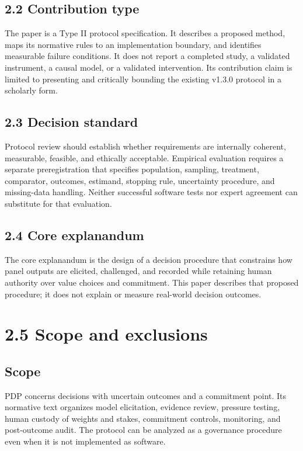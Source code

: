 \documentclass[
  english,
]{article}
\begin{document}
\subsection{2.2 Contribution type}\label{contribution-type}

The paper is a Type II protocol specification. It describes a proposed
method, maps its normative rules to an implementation boundary, and
identifies measurable failure conditions. It does not report a completed
study, a validated instrument, a causal model, or a validated
intervention. Its contribution claim is limited to presenting and
critically bounding the existing v1.3.0 protocol in a scholarly form.

\subsection{2.3 Decision standard}\label{decision-standard}

Protocol review should establish whether requirements are internally
coherent, measurable, feasible, and ethically acceptable. Empirical
evaluation requires a separate preregistration that specifies
population, sampling, treatment, comparator, outcomes, estimand,
stopping rule, uncertainty procedure, and missing-data handling. Neither
successful software tests nor expert agreement can substitute for that
evaluation.

\subsection{2.4 Core explanandum}\label{core-explanandum}

The core explanandum is the design of a decision procedure that
constrains how panel outputs are elicited, challenged, and recorded
while retaining human authority over value choices and commitment. This
paper describes that proposed procedure; it does not explain or measure
real-world decision outcomes.

\section{2.5 Scope and exclusions}\label{scope-and-exclusions}

\subsection{Scope}\label{scope}

PDP concerns decisions with uncertain outcomes and a commitment point.
Its normative text organizes model elicitation, evidence review,
pressure testing, human custody of weights and stakes, commitment
controls, monitoring, and post-outcome audit. The protocol can be
analyzed as a governance procedure even when it is not implemented as
software.
\end{document}
